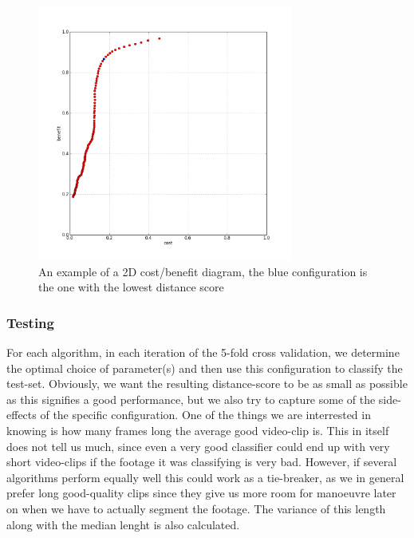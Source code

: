 %
\begin{figure}
     \centering
     \includegraphics[width=0.75\textwidth]{img/2dcostbenefitexample2.jpg}
     \caption{An example of a 2D cost/benefit diagram, the blue configuration is the one with the lowest distance score}
\end{figure}
%
\subsubsection{Testing}
For each algorithm, in each iteration of the 5-fold cross validation, we determine the optimal choice of parameter(s) and then use this configuration to classify the test-set. Obviously, we want the resulting distance-score to be as small as possible as this signifies a good performance, but we also try to capture some of the side-effects of the specific configuration. One of the things we are interrested in knowing is how many frames long the average good video-clip is. This in itself does not tell us much, since even a very good classifier could end up with very short video-clips if the footage it was classifying is very bad. However, if several algorithms perform equally well this could work as a tie-breaker, as we in general prefer long good-quality clips since they give us more room for manoeuvre later on when we have to actually segment the footage. The variance of this length along with the median lenght is also calculated.
%
